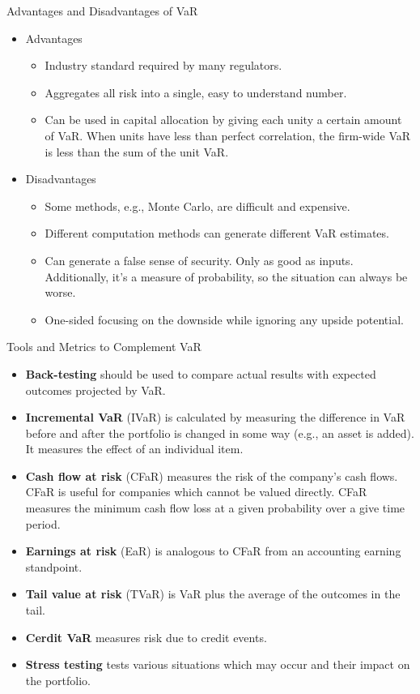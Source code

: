 \documentclass[../custom]{flashcards}
\newcommand{\studyArea}{Risk Management}
\begin{document}
\begin{flashcard}[\studyArea]{Advantages and Disadvantages of VaR}
    \begin{itemize}
        \item Advantages
        \begin{itemize}
            \item Industry standard required by many regulators.
            \item Aggregates all risk into a single, easy to understand number.
            \item Can be used in capital allocation by giving each unity a certain amount of VaR. When units have less than perfect correlation, the firm-wide VaR is less than the sum of the unit VaR.
        \end{itemize}
        \item Disadvantages
        \begin{itemize}
            \item Some methods, e.g., Monte Carlo, are difficult and expensive.
            \item Different computation methods can generate different VaR estimates.
            \item Can generate a false sense of security. Only as good as inputs. Additionally, it's a measure of probability, so the situation can always be worse.
            \item One-sided focusing on the downside while ignoring any upside potential.
        \end{itemize}
    \end{itemize}
\end{flashcard}

\begin{flashcard}[\studyArea]{Tools and Metrics to Complement VaR}
    \begin{itemize}
        \item \textbf{Back-testing} should be used to compare actual results with expected outcomes projected by VaR.
        \item \textbf{Incremental VaR} (IVaR) is calculated by measuring the difference in VaR before and after the portfolio is changed in some way (e.g., an asset is added). It measures the effect of an individual item.
        \item \textbf{Cash flow at risk} (CFaR) measures the risk of the company's cash flows. CFaR is useful for companies which cannot be valued directly. CFaR measures the minimum cash flow loss at a given probability over a give time period.
        \item \textbf{Earnings at risk} (EaR) is analogous to CFaR from an accounting earning standpoint.
        \item \textbf{Tail value at risk} (TVaR) is VaR plus the average of the outcomes in the tail.
        \item \textbf{Cerdit VaR} measures risk due to credit events.
        \item \textbf{Stress testing} tests various situations which may occur and their impact on the portfolio.
    \end{itemize}
\end{flashcard}
\end{document}
